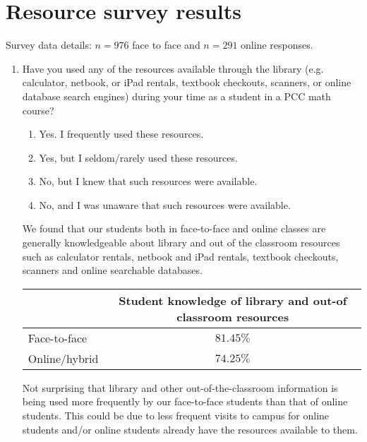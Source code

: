 \chapter{Resource survey results}\label{app:sec:resourcesurvey}
Survey data details: $n=976$ face to face and $n=291$ online responses.

\begin{enumerate}
	\item Have you used any of the resources available through the library (e.g. calculator, netbook, or iPad rentals, textbook checkouts, scanners, or online database search engines) during your time as a student in a PCC math course?
	\begin{enumerate}
		\item     Yes. I frequently used these resources.
		\item    Yes, but I seldom/rarely used these resources.
		\item     No, but I knew that such resources were available.
		\item     No, and I was unaware that such resources were available.
	\end{enumerate}
	We found that our students both in face-to-face and online classes are generally knowledgeable about library and out of the classroom resources such as calculator rentals, netbook and iPad rentals, textbook checkouts, scanners and online searchable databases.
		
	\begin{tabular}{lc}
		\toprule
		              & Student knowledge of library and out-of classroom resources \\
		\midrule
		Face-to-face  & $81.45\%$                                                   \\
		Online/hybrid & $74.25\%$                                                   \\
		\bottomrule
	\end{tabular}
	
	Not surprising that library and other out-of-the-classroom information is being used more frequently by our face-to-face students than that of online students. This could be due to less frequent visits to campus for online students and/or online students already have the resources available to them. 
	

\end{enumerate}
